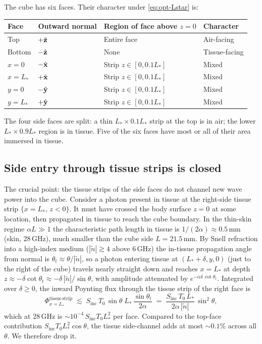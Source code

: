 \documentclass[11pt,a4paper]{article}
\theoremstyle{definition}
\theoremstyle{remark}
\newcommand{\Sinc}{S_{\mathrm{inc}}}
\newcommand{\Tzero}{T_0}
\newcommand{\ntilde}{\tilde{n}}
\newcommand{\Lact}{L_{\!*}}
\begin{document}
The cube has six faces. Their character under \cref{eq:opt-Lstar}
is:

\begin{center}
\begin{tabular}{@{}llll@{}}
\toprule
Face & Outward normal & Region of face above $z=0$ & Character \\
\midrule
Top    & $+\hat{\vb z}$ & Entire face       & Air-facing \\
Bottom & $-\hat{\vb z}$ & None              & Tissue-facing \\
$x=0$  & $-\hat{\vb x}$ & Strip $z\in[0,0.1\Lact]$ & Mixed \\
$x=\Lact$ & $+\hat{\vb x}$ & Strip $z\in[0,0.1\Lact]$ & Mixed \\
$y=0$  & $-\hat{\vb y}$ & Strip $z\in[0,0.1\Lact]$ & Mixed \\
$y=\Lact$ & $+\hat{\vb y}$ & Strip $z\in[0,0.1\Lact]$ & Mixed \\
\bottomrule
\end{tabular}
\end{center}

The four side faces are split: a thin $\Lact\times 0.1\Lact$ strip at
the top is in air; the lower $\Lact\times 0.9\Lact$ region is in
tissue. Five of the six faces have most or all of their area immersed
in tissue.

\subsection{Side entry through tissue strips is closed}

The crucial point: the tissue strips of the side faces do not channel
new wave power into the cube. Consider a photon present in tissue at
the right-side tissue strip $\{x=\Lact,\,z<0\}$. It must have crossed
the body surface $z=0$ at some location, then propagated in tissue to
reach the cube boundary. In the thin-skin regime $\alpha L\gg 1$ the
characteristic path length in tissue is $1/(2\alpha)\approx 0.5$\,mm
(skin, 28\,GHz), much smaller than the cube side $L=21.5$\,mm. By
Snell refraction into a high-index medium ($|\ntilde|\gtrsim 4$ above
6\,GHz) the in-tissue propagation angle from normal is
$\theta_t\approx\theta/|\ntilde|$, so a photon entering tissue at
$(\Lact+\delta,y,0)$ (just to the right of the cube) travels nearly
straight down and reaches $x=\Lact$ at depth
$z\approx -\delta\cot\theta_t \approx -\delta\,|\ntilde|/\sin\theta$,
with amplitude attenuated by $e^{-\alpha\delta\,\cot\theta_t}$.
Integrated over $\delta\geq 0$, the inward Poynting flux through
the tissue strip of the right face is
\begin{equation}\label{eq:side-channel-bound}
  \Phi^{\mathrm{tissue\,strip}}_{x=\Lact}
  \;\lesssim\; \Sinc\,\Tzero\,\sin\theta\;\Lact\,
    \frac{\sin\theta_t}{2\alpha}
  \;=\; \frac{\Sinc\,\Tzero\,\Lact}{2\alpha\,|\ntilde|}\,\sin^2\theta,
\end{equation}
which at 28\,GHz is $\sim 10^{-4}\,\Sinc\Tzero\Lact^2$ per face.
Compared to the top-face contribution $\Sinc\Tzero\Lact^2\cos\theta$,
the tissue side-channel adds at most $\sim 0.1\%$ across all
$\theta$. We therefore drop it.
\end{document}
